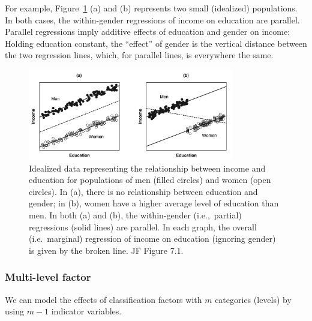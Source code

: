For example, Figure~\ref{fig:income_education_gender} (a) and (b) represents two small (idealized) populations.
In both cases, the within-gender regressions of income on education are parallel.
Parallel regressions imply additive effects of education and gender on income: Holding education constant, the ``effect'' of gender is the vertical distance between the two regression lines, which, for parallel lines, is everywhere the same.
%
\begin{figure}[H]
\begin{center}
  \includegraphics[width=0.8\textwidth]{Lecture15/Figure7_1}
  \caption{Idealized data representing the relationship between income and education for populations of men (filled circles) and women (open circles).  In (a), there is no relationship between education and gender; in (b), women have a higher average level of education than men.
  In both (a) and (b), the within-gender (i.e.,~partial) regressions (solid lines) are parallel.  In each graph, the overall (i.e.~marginal) regression of income on education (ignoring gender) is given by the broken line.
   JF Figure 7.1.}
  \label{fig:income_education_gender}
\end{center}
\end{figure}
%

\subsubsection*{Multi-level factor}

We can model the effects of classification factors with $m$ categories (levels) by using $m-1$ indicator variables.

